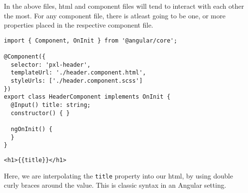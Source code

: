 In the above files, html and component files will tend to interact with each 
other the most. For any component file, there is atleast going to be one, or 
more properties placed in the respective component file. 
\begin{lstlisting}[caption=header.component.ts]
import { Component, OnInit } from '@angular/core';

@Component({
  selector: 'pxl-header',
  templateUrl: './header.component.html',
  styleUrls: ['./header.component.scss']
})
export class HeaderComponent implements OnInit {
  @Input() title: string;
  constructor() { }

  ngOnInit() {
  }
} 
\end{lstlisting}

\begin{lstlisting}[caption=header.component.html]
<h1>{{title}}</h1>
\end{lstlisting}

Here, we are interpolating the \lstinline{title} property into our html, by 
using double curly braces around the value. This is classic syntax in an 
Angular setting. 
